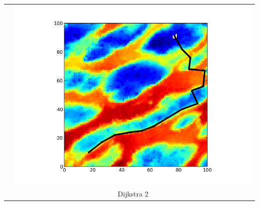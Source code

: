 \documentclass[11pt]{beamer}
\begin{document}
\begin{frame}[Résultats]
{\begin{tabular}{cc}
&\includegraphics[scale=0.22]{../data/None_dijkstra/plot_A_10_17_B_91_77_iteration_015.png} \\
&Dijkstra 2\\
\end{tabular}
}
\end{frame}







\end{document}
